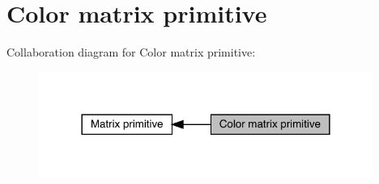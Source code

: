 \hypertarget{group__primcolormatrix}{}\section{Color matrix primitive}
\label{group__primcolormatrix}
Collaboration diagram for Color matrix primitive\+:\nopagebreak
\begin{figure}[H]
\begin{center}
\leavevmode
\includegraphics[width=309pt]{dd/d2f/group__primcolormatrix}
\end{center}
\end{figure}
